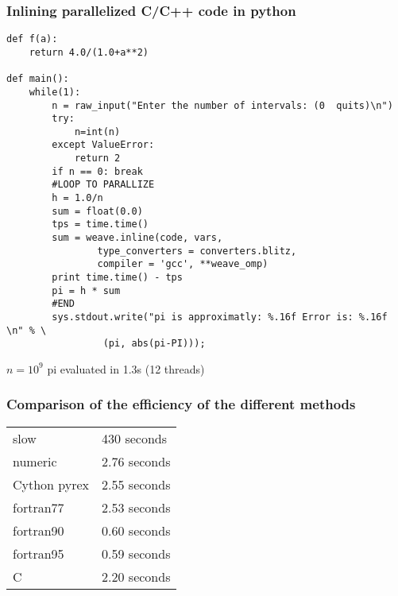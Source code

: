 \documentclass[12pt]{beamer}
\begin{document}
\begin{frame}[fragile]
  \frametitle{Inlining parallelized C/C++ code in python}
  \begin{verbatim}
def f(a):
    return 4.0/(1.0+a**2)

def main():
    while(1):
        n = raw_input("Enter the number of intervals: (0  quits)\n")
        try:
            n=int(n)
        except ValueError:
            return 2
        if n == 0: break
        #LOOP TO PARALLIZE
        h = 1.0/n
        sum = float(0.0)
        tps = time.time()
        sum = weave.inline(code, vars,
                type_converters = converters.blitz, 
                compiler = 'gcc', **weave_omp)
        print time.time() - tps
        pi = h * sum
        #END
        sys.stdout.write("pi is approximatly: %.16f Error is: %.16f \n" % \
                 (pi, abs(pi-PI)));

  \end{verbatim}
$n = 10^9$ pi evaluated in 1.3s (12 threads)
\end{frame}

\begin{frame}
  \frametitle{Comparison of the efficiency of the different methods}
  \begin{block}{}
    \begin{tabular}{l l}
slow & 430  seconds \\
numeric & 2.76 seconds \\
Cython pyrex & 2.55 seconds \\
fortran77 & 2.53 seconds \\
fortran90 & 0.60 seconds  \\
fortran95 & 0.59 seconds \\ \hline
C & 2.20 seconds \\
    \end{tabular}
  \end{block}
\end{frame}
\end{document}
